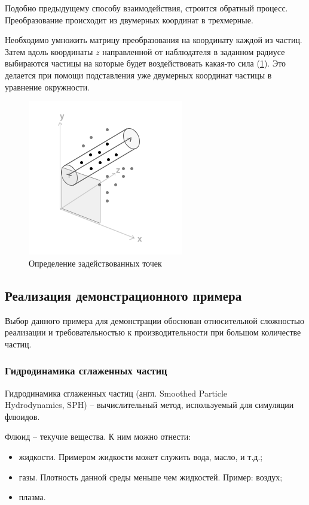 Подобно предыдущему способу взаимодействия, строится обратный процесс. 
Преобразование происходит из двумерных координат в трехмерные.

Необходимо умножить матрицу преобразования на координату каждой из частиц. 
Затем вдоль координаты $z$ направленной от наблюдателя в заданном радиусе
выбираются частицы на которые будет воздействовать какая-то сила (\ref{fig:user_input}). 
Это делается при помощи подставления уже двумерных координат частицы в 
уравнение окружности.


\begin{figure}
\begin{center}
  \includegraphics[scale=1.0]{Figures/user_input}
\end{center}
\caption{Определение задействованных точек}
\label{fig:user_input}
\end{figure}

\subsection{Реализация демонстрационного примера}

Выбор данного примера для демонстрации обоснован относительной сложностью реализации
и требовательностью к производительности при большом количестве частиц.

\subsubsection{Гидродинамика сглаженных частиц}

Гидродинамика сглаженных частиц (англ. Smoothed Particle \\ 
Hydrodynamics, SPH) -- вычислительный 
метод, используемый для симуляции флюидов.

Флюид -- текучие вещества. К ним можно отнести:
\begin{itemize}
  \item жидкости. Примером жидкости может служить вода, масло, и т.д.;
  \item газы. Плотность данной среды меньше чем жидкостей. Пример: воздух;
  \item плазма.
\end{itemize}

